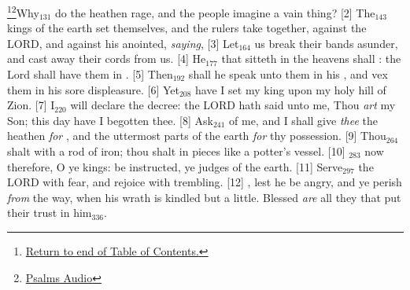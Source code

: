 \footnote{\textcolor[cmyk]{0.99998,1,0,0}{\hyperlink{TOC}{Return to end of Table of Contents.}}}\footnote{\href{https://www.audioverse.org/english/audiobibles/books/ENGKJV/O/Ps/1}{\textcolor[cmyk]{0.99998,1,0,0}{Psalms Audio}}}\textcolor[cmyk]{0.99998,1,0,0}{Why\textcolor{jungle}{$_{131}$} do the heathen rage, and the people imagine a vain thing?}
[2] \textcolor[cmyk]{0.99998,1,0,0}{The\textcolor{jungle}{$_{143}$} kings of the earth set themselves, and the rulers take  together, against the LORD, and against his anointed, \emph{saying},}
[3] \textcolor[cmyk]{0.99998,1,0,0}{Let\textcolor{jungle}{$_{164}$} us break their bands asunder, and cast away their cords from us.}
[4] \textcolor[cmyk]{0.99998,1,0,0}{He\textcolor{jungle}{$_{177}$} that sitteth in the heavens shall : the Lord shall have them in .}
[5] \textcolor[cmyk]{0.99998,1,0,0}{Then\textcolor{jungle}{$_{192}$} shall he speak unto them in his , and vex them in his sore displeasure.}
[6] \textcolor[cmyk]{0.99998,1,0,0}{Yet\textcolor{jungle}{$_{208}$} have I set my king upon my holy hill of Zion.}
[7] \textcolor[cmyk]{0.99998,1,0,0}{I\textcolor{jungle}{$_{220}$} will declare the decree: the LORD hath said unto me, Thou \emph{art} my Son; this day have I begotten thee.}
[8] \textcolor[cmyk]{0.99998,1,0,0}{Ask\textcolor{jungle}{$_{241}$} of me, and I shall give \emph{thee} the heathen \emph{for} , and the uttermost parts of the earth \emph{for} thy possession.}
[9] \textcolor[cmyk]{0.99998,1,0,0}{Thou\textcolor{jungle}{$_{264}$} shalt  with a rod of iron; thou shalt  in pieces like a potter's vessel.}
[10] \textcolor[cmyk]{0.99998,1,0,0}{\textcolor{jungle}{$_{283}$}  now therefore, O ye kings: be instructed, ye judges of the earth.}
[11] \textcolor[cmyk]{0.99998,1,0,0}{Serve\textcolor{jungle}{$_{297}$} the LORD with fear, and rejoice with trembling.}
[12] \textcolor[cmyk]{0.99998,1,0,0}{, lest he be angry, and ye perish \emph{from} the way, when his wrath is kindled but a little. Blessed \emph{are} all they that put their trust in him\textcolor{jungle}{$_{336}$}.}

